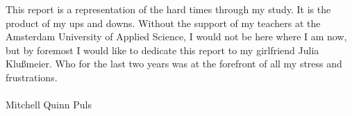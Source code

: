 This report is a representation of the hard times through my study. It is the product of my ups and downs. Without the support of my teachers at the Amsterdam University of Applied Science, I would not be here where I am now, but by foremost I would like to dedicate this report to my girlfriend Julia Klu{\ss}meier. Who for the last two years was at the forefront of all my stress and frustrations.\\~\\
Mitchell Quinn Puls